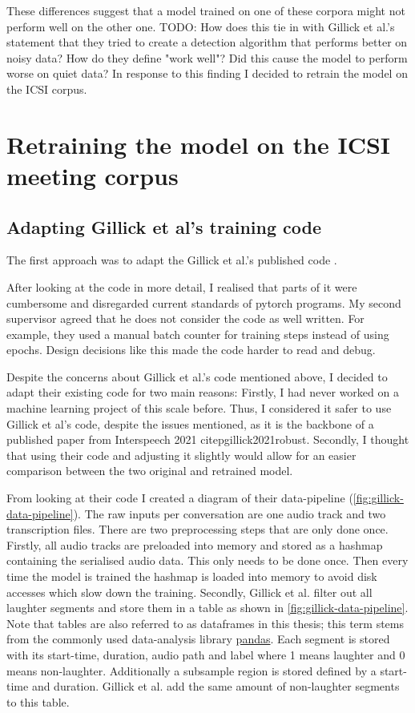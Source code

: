 \documentclass[bsc,frontabs,parskip,deptreport]{infthesis}
\begin{document}
These differences suggest that a model trained on one of these corpora might not perform well on the other one. 
TODO: How does this tie in with Gillick et al.'s statement that they tried to create a detection algorithm that performs better on noisy data? How do they define "work well"? Did this cause the model to perform worse on quiet data?
In response to this finding I decided to retrain the model on the ICSI corpus. 

\chapter{Retraining the model on the ICSI meeting corpus} \label{cha:retraining}
\section{Adapting Gillick et al's training code} 
The first approach was to adapt the Gillick et al.'s published code \citep{gillick-codebase}. 


After looking at the code in more detail, I realised that parts of it were cumbersome and disregarded current standards of pytorch programs. 
My second supervisor agreed that he does not consider the code as well written.
For example, they used a manual batch counter for training steps instead of using epochs.  
Design decisions like this made the code harder to read and debug. 

Despite the concerns about Gillick et al.'s code mentioned above, I decided to adapt their existing code for two main reasons:
Firstly, I had never worked on a machine learning project of this scale before. Thus, I considered it safer to use Gillick et al's code, despite the issues mentioned, as it is the backbone of a published paper from Interspeech 2021 citep{gillick2021robust}. 
Secondly, I thought that using their code and adjusting it slightly would allow for an easier comparison between the two original and retrained model. 

From looking at their code I created a diagram of their data-pipeline (\autoref{fig:gillick-data-pipeline}). The raw inputs per conversation are one audio track and two transcription files. 
There are two preprocessing steps that are only done once.
Firstly, all audio tracks are preloaded into memory and stored as a hashmap containing the serialised audio data. This only needs to be done once. Then every time the model is trained the hashmap is loaded into memory to avoid disk accesses which slow down the training. 
Secondly, Gillick et al. filter out all laughter segments and store them in a table as shown in \autoref{fig:gillick-data-pipeline}. Note that tables are also referred to as dataframes in this thesis; this term stems from the commonly used data-analysis library \href{https://pandas.pydata.org/}{pandas}.
Each segment is stored with its start-time, duration, audio path and label where 1 means laughter and 0 means non-laughter. Additionally a subsample region is stored defined by a start-time and duration. 
Gillick et al. add the same amount of non-laughter segments to this table. 
\end{document}
